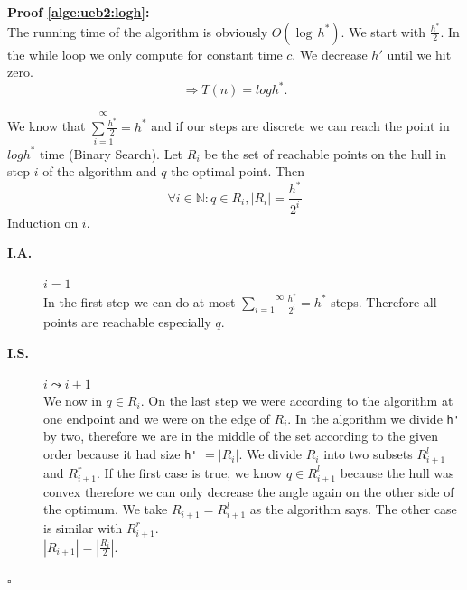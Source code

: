 \documentclass[11pt,a4paper,ngerman]{article}
\begin{document}
\begin{description}
\textbf{Proof \ref{alge:ueb2:logh}:}\\
The running time of the algorithm is obviously $O(\log \, h^*)$.
We start with $\frac{h^*}{2}$. In the while loop we only
compute for constant time $c$. We decrease $h'$ until we hit zero.
$$
\Rightarrow T(n) = log h^*.
$$

We know that $\overset{\infty}{\underset{i=1}{\sum \frac{h^*}{2}}} = h^*$
and if our steps are discrete we can reach the point in $log h^*$ time
(Binary Search).
Let $R_i$ be the set of reachable points on the hull in step $i$
of the algorithm and $q$ the optimal point. Then
$$
    \forall i \in \mathbb{N} : q \in R_i, |R_i| = \frac{h^*}{2^i}
$$
Induction on $i$.
\begin{description}
    \item[\bfseries I.A.] $i=1$\\
    In the first step we can do at most 
    $\overset{\infty}{\underset{i=1}{\sum}} \frac{h^*}{2^i} = h^*$
    steps. Therefore all points are reachable especially $q$.
    \item[\bfseries I.S.] $i \leadsto i+1$\\
    We now in $q \in R_i$. On the last step we were
    according to the algorithm at one endpoint and we were on the
    edge of $R_i$. In the algorithm we divide \lstinline|h'| by two,
    therefore we are in the middle of the set according to the given order
    because it had size \lstinline|h'| $= |R_i|$.
    We divide $R_i$ into two subsets $R_{i+1}^l$ and $R_{i+1}^r$.
    If the first case is true, we know $q \in R_{i+1}^l$ because
    the hull was convex therefore we can only decrease the angle again
    on the other side of the optimum. We take $R_{i+1}=R_{i+1}^l$
    as the algorithm says. The other case is similar with $R_{i+1}^r$.\\
    $|R_{i+1}| = |\frac{R_i}{2}|$.
\end{description}
\mbox{}\hfill$\square$




\end{description}
\end{document}
